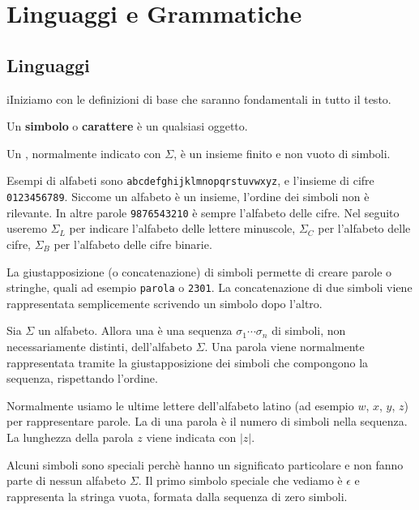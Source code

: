 \setchapterpreamble[u]{\margintoc}
\chapter{Linguaggi e Grammatiche}\label{cha:linguaggi+grammatiche}

\section{Linguaggi}
iIniziamo con le definizioni di base che saranno fondamentali in tutto il testo.

Un \textbf{simbolo} o \textbf{carattere} è un qualsiasi oggetto.


\begin{definition}[Alfabeto]\label{def:alfabeto}
Un , normalmente indicato con $\Sigma$, è un insieme finito e non vuoto di simboli.
\end{definition}

Esempi di alfabeti sono \texttt{abcdefghijklmnopqrstuvwxyz}, e l'insieme di cifre \texttt{0123456789}.
Siccome un alfabeto è un insieme, l'ordine dei simboli non è rilevante.
In altre parole \texttt{9876543210} è sempre l'alfabeto delle cifre.
Nel seguito useremo $\Sigma_{L}$ per indicare l'alfabeto delle lettere minuscole, $\Sigma_{C}$ per l'alfabeto delle cifre,
$\Sigma_{B}$ per l'alfabeto delle cifre binarie.


La giustapposizione (o concatenazione) di simboli permette di creare parole o stringhe, quali ad
esempio \texttt{parola} o \texttt{2301}.
La concatenazione di due simboli viene rappresentata semplicemente scrivendo un simbolo dopo l'altro.


\begin{definition}[Parola]\label{def:parola}
Sia $\Sigma$ un alfabeto.
Allora una  è una sequenza $\sigma_{1}\cdots\sigma_{n}$ di simboli, non necessariamente
distinti, dell'alfabeto $\Sigma$.
Una parola viene normalmente rappresentata tramite la giustapposizione dei
simboli che compongono la sequenza, rispettando l'ordine.
\end{definition}

Normalmente usiamo le ultime lettere dell'alfabeto latino (ad esempio $w$, $x$,
$y$, $z$) per rappresentare parole.
La  di una parola è il numero di simboli nella sequenza.
La lunghezza della parola $z$ viene indicata con $|z|$.

Alcuni simboli sono speciali perchè hanno un significato particolare e non fanno parte di nessun alfabeto $\Sigma$.
Il primo simbolo speciale che vediamo è $\epsilon$ e rappresenta la stringa vuota,
formata dalla sequenza di zero simboli.

